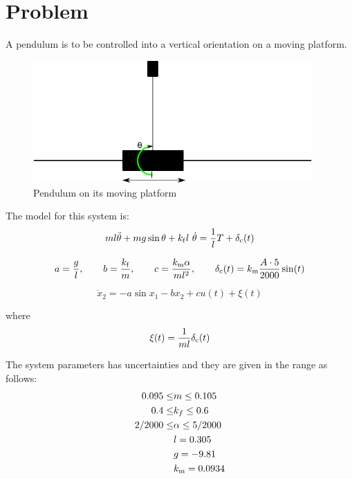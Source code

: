 \chapter{Problem}
A pendulum is to be controlled into a vertical orientation on a moving platform.
\begin{figure}[htbp]
        \centering
        \includegraphics[width=0.95\textwidth]{pendul.png}
        \caption{Pendulum on its moving platform}
        \label{fig:problem}
\end{figure}
The model for this system is:
\begin{equation}
        m l \Ddot{\theta} + m g \sin\theta + k_{\mathrm{f}}  l \ \dot{\theta} = \frac{1}{l}T + \delta_{\mathrm{c}}(t)
\end{equation}

\begin{equation}
        a=\frac{g}{l}, \qquad b=\frac{k_{\mathrm{f}}}{m}, \qquad c= \frac{k_{\mathrm{m}}\alpha}{m l^2}, \qquad \delta_{\mathrm{c}}(t) = k_{\mathrm{m}} \frac{A\cdot5}{2000}\sin(t)
\end{equation}

\begin{equation}
        \dot{x}_2 = - a \sin x_1 - b x_2 + c u(t) + \xi(t)
\end{equation}

where
\begin{equation}
        \xi(t) = \frac{1}{m l} \delta_{\mathrm{c}}(t)
\end{equation}

The system parameters has uncertainties and they are given in the range as follows:
\begin{equation}
        \begin{split}
                0.095 \leq &m \leq 0.105 \\
                0.4 \leq &k_f \leq 0.6 \\
                2/2000 \leq &\alpha \leq 5/2000 \\
                &l = 0.305 \\
                &g = -9.81 \\
                &k_{\mathrm{m}} = 0.0934 \\
        \end{split}
\end{equation}

